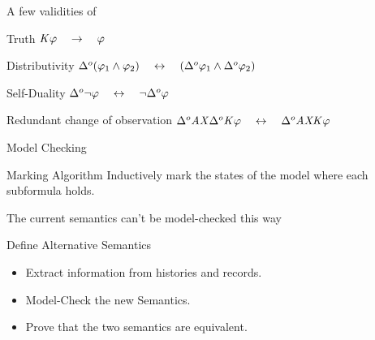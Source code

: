 \begin{frame}{A few validities of \ctlskd}

  \begin{block}{Truth}
    $\mathit{K}\varphi\quad\rightarrow\quad\varphi$
  \end{block}
  \vfill
  \begin{block}{Distributivity}
    $\Delta^{o}(\varphi_1\wedge\varphi_2)\quad\leftrightarrow\quad(\Delta^{o}\varphi_1\wedge\Delta^{o}\varphi_2)$
  \end{block}
  \vfill
  \begin{block}{Self-Duality}
    $\Delta^{o}\neg\varphi\quad\leftrightarrow\quad\neg\Delta^{o}\varphi$
  \end{block}
  \vfill
  \begin{block}{Redundant change of observation}
    $\Delta^{o}\mathit{A}\mathit{X}\Delta^{o}\mathit{K}\varphi\quad\leftrightarrow\quad\Delta^{o}\mathit{A}\mathit{X}\mathit{K}\varphi$
  \end{block}
\end{frame}


\begin{frame}{Model Checking \ctlskd}

  \begin{block}{Marking Algorithm}
    Inductively mark the states of the model where each subformula holds.
  \end{block}
  \vfill
  \begin{alertblock}{The current semantics can't be model-checked this way}
  \end{alertblock}
  \vfill
  \begin{exampleblock}{Define Alternative Semantics}
    \begin{itemize}
    \item Extract information from histories and records.
    \item Model-Check the new Semantics.
    \item Prove that the two semantics are equivalent.
    \end{itemize}
  \end{exampleblock}
  
\end{frame}

